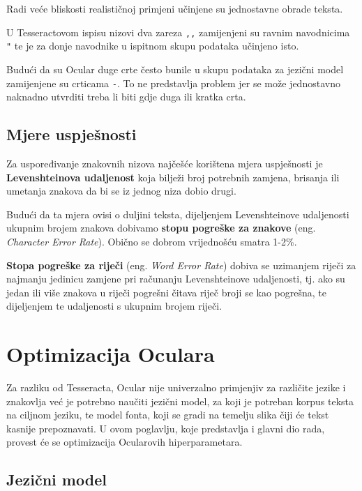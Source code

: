\documentclass[zavrsnirad]{fer}
\begin{document}
Radi veće bliskosti realističnoj primjeni učinjene su jednostavne obrade teksta.

U Tesseractovom ispisu nizovi dva zareza \texttt{,,} zamijenjeni su ravnim navodnicima \texttt{"} te je za donje navodnike u ispitnom skupu podataka učinjeno isto.

Budući da su Ocular duge crte često bunile u skupu podataka za jezični model zamijenjene su crticama \texttt{-}. To ne predstavlja problem jer se može jednostavno naknadno utvrditi treba li biti gdje duga ili kratka crta.



\section{Mjere uspješnosti}

Za uspoređivanje znakovnih nizova najčešće korištena mjera uspješnosti je \textbf{Levenshteinova udaljenost} koja bilježi broj potrebnih zamjena, brisanja ili umetanja znakova da bi se iz jednog niza dobio drugi. \cite{Levenshtein1965}

Budući da ta mjera ovisi o duljini teksta, dijeljenjem Levenshteinove udaljenosti ukupnim brojem znakova dobivamo \textbf{stopu pogreške za znakove} (eng. \textit{Character Error Rate}). Obično se dobrom vrijednošću smatra 1-2\%.

\textbf{Stopa pogreške za riječi} (eng. \textit{Word Error Rate}) dobiva se uzimanjem riječi za najmanju jedinicu zamjene pri računanju Levenshteinove udaljenosti, tj. ako su jedan ili više znakova u riječi pogrešni čitava riječ broji se kao pogrešna, te dijeljenjem te udaljenosti s ukupnim brojem riječi.


\chapter{Optimizacija Oculara}
\label{pog:optimizacija_oculara}

Za razliku od Tesseracta, Ocular nije univerzalno primjenjiv za različite jezike i znakovlja već je potrebno naučiti jezični model, za koji je potreban korpus teksta na ciljnom jeziku, te model fonta, koji se gradi na temelju slika čiji će tekst kasnije prepoznavati. U ovom poglavlju, koje predstavlja i glavni dio rada, provest će se optimizacija Ocularovih hiperparametara.

\section{Jezični model}
\end{document}
